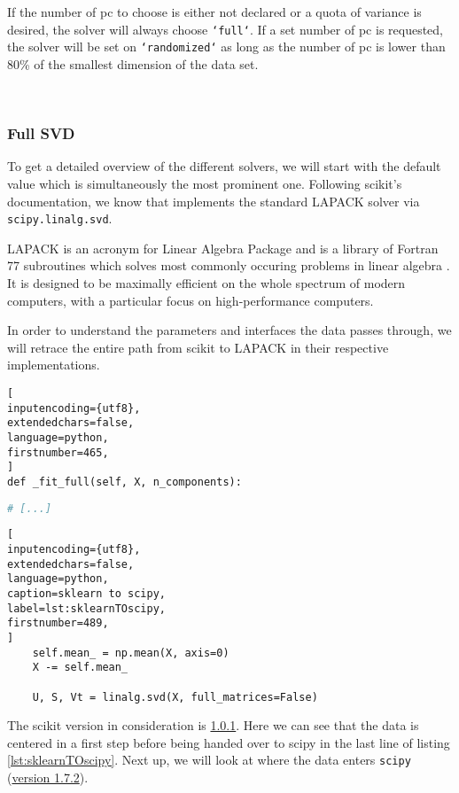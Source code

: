If the number of \gls{pc} to choose is either not declared or a quota of variance is desired, the solver will always choose \texttt{`full`}.
If a set number of \gls{pc} is requested, the solver will be set on \texttt{`randomized`} as long as the number of \gls{pc} is lower than 80\% of the smallest dimension of the data set.


\ \clearpage


\subsubsection{Full SVD}

To get a detailed overview of the different solvers, we will start with the default value which is simultaneously the most prominent one.
Following \gls{scikit}'s documentation, we know that \cite{scikit-learn} implements the standard LAPACK solver via \texttt{scipy.linalg.svd}.
\bigskip

LAPACK is an acronym for Linear Algebra Package and is a library of Fortran 77 subroutines which solves most commonly occuring problems in linear algebra \cite{anderson1999lapack}.
It is designed to be maximally efficient on the whole spectrum of modern computers, with a particular focus on high-performance computers.

In order to understand the parameters and interfaces the data passes through, we will retrace the entire path from \gls{scikit} to LAPACK in their respective implementations.


\begin{lstlisting}[
inputencoding={utf8}, 
extendedchars=false, 
language=python,
firstnumber=465,
]
def _fit_full(self, X, n_components):
\end{lstlisting}
%
%
%
\spacingConcatLists
\begin{lstlisting}[language=python, numbers=none]
     # [...]
\end{lstlisting}
%
%
%
\spacingConcatLists
\begin{lstlisting}[
inputencoding={utf8}, 
extendedchars=false, 
language=python, 
caption=sklearn to scipy, 
label=lst:sklearnTOscipy,
firstnumber=489,
]
    self.mean_ = np.mean(X, axis=0)
    X -= self.mean_

    U, S, Vt = linalg.svd(X, full_matrices=False)
\end{lstlisting}



\noindent
The \gls{scikit} version in consideration is \href{\scikitPCAvIxOxI{_pca}}{1.0.1}.
Here we can see that the data is centered in a first step before being handed over to scipy in the last line of listing \ref{lst:sklearnTOscipy}.
Next up, we will look at where the data enters \texttt{scipy} (\href{\scipyvIxVIIxII{decomp_svd}}{version 1.7.2}).



